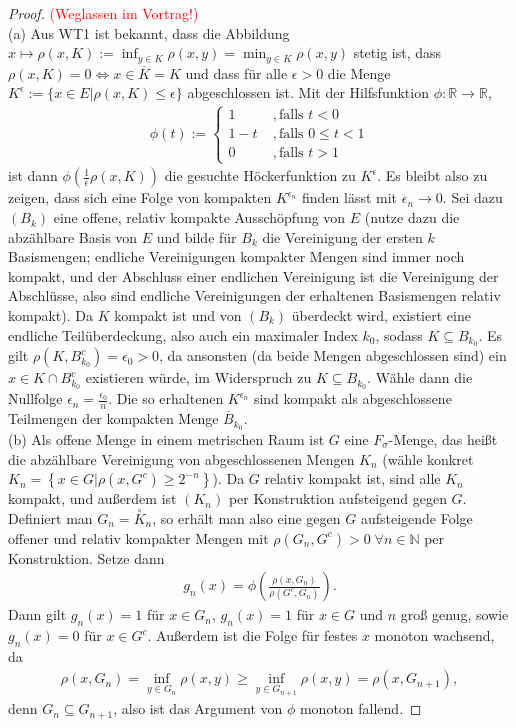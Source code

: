 \documentclass[twoside]{article}
\theoremstyle{definition}
\begin{document}
\begin{proof} \textcolor{red}{(Weglassen im Vortrag!)}\\
(a) Aus WT1 ist bekannt, dass die Abbildung $x \mapsto \rho(x,K) := \inf_{y \in K} \rho(x,y) =  \min_{y \in K} \rho(x,y)$ stetig ist, dass $\rho(x,K)=0 \Leftrightarrow x \in \overline{K} = K$ und dass für alle $\epsilon > 0$ die Menge $K^\epsilon := \{x \in E | \rho(x,K) \leq \epsilon\}$ abgeschlossen ist. Mit der Hilfsfunktion $\phi:\mathbb{R} \to \mathbb{R}$,
\begin{align}
\phi(t) := \begin{cases}
1 &\; , \text{falls } t < 0\\
1-t &\; , \text{falls } 0 \leq t < 1\\
0 &\; , \text{falls } t > 1
\end{cases}
\end{align}
ist dann $\phi\left(\frac{1}{\epsilon} \rho(x,K) \right)$ die gesuchte Höckerfunktion zu $K^\epsilon$. Es bleibt also zu zeigen, dass sich eine Folge von kompakten $K^{\epsilon_n}$ finden lässt mit $\epsilon_n \to 0$. Sei dazu $(B_k)$ eine offene, relativ kompakte Ausschöpfung von $E$ (nutze dazu die abzählbare Basis von $E$ und bilde für $B_k$ die Vereinigung der ersten $k$ Basismengen; endliche Vereinigungen kompakter Mengen sind immer noch kompakt, und der Abschluss einer endlichen Vereinigung ist die Vereinigung der Abschlüsse, also sind endliche Vereinigungen der erhaltenen Basismengen relativ kompakt). Da $K$ kompakt ist und von $(B_k)$ überdeckt wird, existiert eine endliche Teilüberdeckung, also auch ein maximaler Index $k_0$, sodass $K \subseteq B_{k_0}$. Es gilt $\rho(K,B_{k_0}^c) = \epsilon_0 > 0$, da ansonsten (da beide Mengen abgeschlossen sind) ein $x \in K \cap B_{k_0}^c$ existieren würde, im Widerspruch zu $K \subseteq B_{k_0}$. Wähle dann die Nullfolge $\epsilon_n = \frac{\epsilon_0}{n}$. Die so erhaltenen $K^{\epsilon_n}$ sind kompakt als abgeschlossene Teilmengen der kompakten Menge $\overline{B}_{k_0}$.\\

(b) Als offene Menge in einem metrischen Raum ist $G$ eine $F_\sigma$-Menge, das heißt die abzählbare Vereinigung von abgeschlossenen Mengen $K_n$ (wähle konkret $K_n=\left\{x \in G | \rho(x,G^c) \geq 2^{-n} \right\}$). Da $G$ relativ kompakt ist, sind alle $K_n$ kompakt, und außerdem ist $(K_n)$ per Konstruktion aufsteigend gegen $G$. Definiert man $G_n = \stackrel{\circ}{K}_n$, so erhält man also eine gegen $G$ aufsteigende Folge offener und relativ kompakter Mengen mit $\rho(G_n,G^c) > 0 \; \forall n \in \mathbb{N}$ per Konstruktion. Setze dann
\begin{align}
g_n(x)= \phi \left( \frac{\rho(x,G_n)}{\rho(G^c,G_n)} \right).
\end{align}
Dann gilt $g_n(x) = 1$ für $x \in G_n$, $g_n(x) = 1$ für $x \in G$ und $n$ groß genug, sowie $g_n(x) = 0$ für $x \in G^c$. Außerdem ist die Folge für festes $x$ monoton wachsend, da
\begin{align}
\rho(x,G_n) = \inf_{y \in G_n} \rho(x,y) \geq  \inf_{y \in G_{n+1}} \rho(x,y) = \rho(x,G_{n+1}),
\end{align} 
denn $G_n \subseteq G_{n+1}$, also ist das Argument von $\phi$ monoton fallend.
\end{proof}
\end{document}
